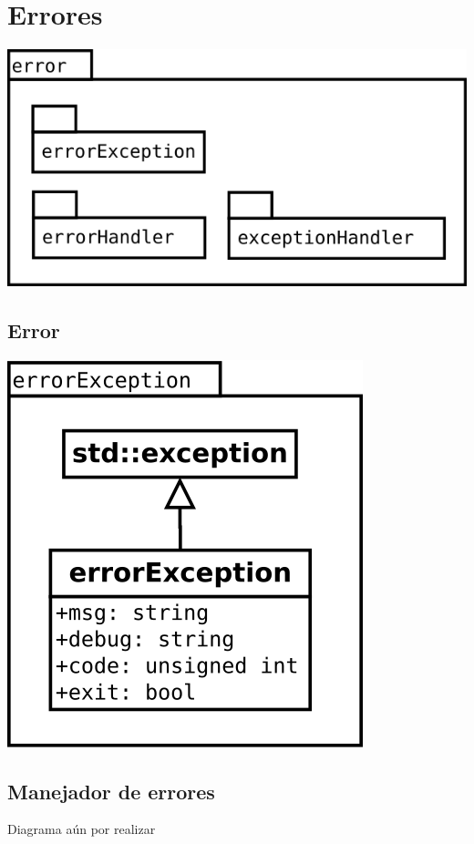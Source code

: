 \section {Errores} 
\begin{center}
\includegraphics[scale=0.4]{error-package.png} \\
\end{center}

\subsection {Error} 
\begin{center}
\includegraphics[scale=0.4]{errorException.png} \\
\end{center}

\subsection {Manejador de errores } 
Diagrama aún por realizar

